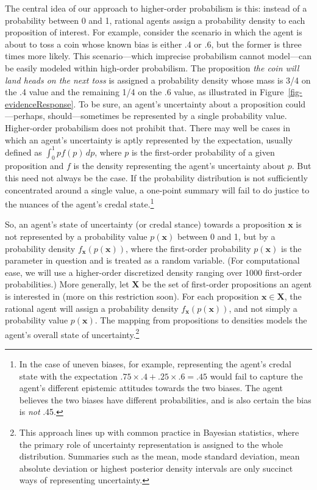 \documentclass[
  letterpaper,
  DIV=11,
  numbers=noendperiod]{scrartcl}
\begin{document}
The central idea of our approach to higher-order probabilism is this:
instead of a probability between 0 and 1, rational agents assign a
probability density to each proposition of interest. For example,
consider the scenario in which the agent is about to toss a coin whose
known bias is either .4 or .6, but the former is three times more
likely. This scenario---which imprecise probabilism cannot model---can
be easily modeled within high-order probabilism. The proposition
\emph{the coin will land heads on the next toss} is assigned a
probability density whose mass is 3/4 on the .4 value and the remaining
1/4 on the .6 value, as illustrated in
Figure~\ref{fig-evidenceResponse}. To be sure, an agent's uncertainty
about a proposition could---perhaps, should---sometimes be represented
by a single probability value. Higher-order probabilism does not
prohibit that. There may well be cases in which an agent's uncertainty
is aptly represented by the expectation, usually defined as
\(\int_{0}^{1} p f(p) \, dp\), where \(p\) is the first-order
probability of a given proposition and \(f\) is the density representing
the agent's uncertainty about \(p\). But this need not always be the
case. If the probability distribution is not sufficiently concentrated
around a single value, a one-point summary will fail to do justice to
the nuances of the agent's credal state.\footnote{In the case of uneven
  biases, for example, representing the agent's credal state with the
  expectation \(.75 \times .4 + .25 \times .6 = .45\) would fail to
  capture the agent's different epistemic attitudes towards the two
  biases. The agent believes the two biases have different
  probabilities, and is also certain the bias is \emph{not} .45.}

So, an agent's state of uncertainty (or credal stance) towards a
proposition \(\mathbf{x}\) is not represented by a probability value
\(p(\mathbf{x})\) between 0 and 1, but by a probability density
\(f_\mathbf{x}(p(\mathbf{x}))\), where the first-order probability
\(p(\mathbf{x})\) is the parameter in question and is treated as a
random variable. (For computational ease, we will use a higher-order
discretized density ranging over 1000 first-order probabilities.) More
generally, let \(\mathbf{X}\) be the set of first-order propositions an
agent is interested in (more on this restriction soon). For each
proposition \(\mathbf{x}\in\mathbf{X}\), the rational agent will assign
a probability density \(f_\mathbf{x}(p(\mathbf{x}))\), and not simply a
probability value \(p(\mathbf{x})\). The mapping from propositions to
densities models the agent's overall state of uncertainty.\footnote{This
  approach lines up with common practice in Bayesian statistics, where
  the primary role of uncertainty representation is assigned to the
  whole distribution. Summaries such as the mean, mode standard
  deviation, mean absolute deviation or highest posterior density
  intervals are only succinct ways of representing uncertainty.}
\end{document}
